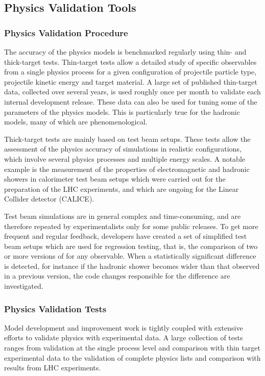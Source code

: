 \label{sec:physvaltools}
\subsection{\textbf{Physics Validation Tools}}

\subsubsection{Physics Validation Procedure}
The accuracy of the \Gfour{} physics models is benchmarked regularly using thin-
and thick-target tests.  Thin-target tests allow a detailed study of specific
observables from a single physics process for a given configuration of
projectile particle type, projectile kinetic energy and target material.
A large set of published thin-target data, collected over several years, is 
used roughly once per month to validate each internal development release. 
These data can also be used for tuning some of the parameters of the physics
models.  This is particularly true for the hadronic models, many of which are 
phenomenological.

Thick-target tests are mainly based on test beam setups.  These tests allow the
assessment of the physics accuracy of \Gfour{} simulations in realistic 
configurations, which involve several physics processes and multiple energy 
scales.  A notable example is the measurement of the properties of 
electromagnetic and hadronic showers in calorimeter test beam setups which were
carried out for the preparation of the LHC experiments, and which are ongoing
for the Linear Collider detector (CALICE).

Test beam simulations are in general complex and time-consuming, and are 
therefore repeated by experimentalists only for some \Gfour{} public releases.
To get more frequent and regular feedback, \Gfour{} developers have created a
set of simplified test beam setups which are used for regression testing, that 
is, the comparison of two or more versions of \Gfour{} for any observable.  
When a statistically significant difference is detected, for instance if the 
hadronic shower becomes wider than that observed in a previous \Gfour{} version,
the code changes responsible for the difference are investigated.

\subsubsection{Physics Validation Tests}
Model development and improvement work is tightly coupled with extensive 
efforts to validate \Gfour{} physics with experimental data.  A large collection 
of tests ranges from validation at the single process level and comparison with 
thin target experimental data to the validation of complete physics lists and 
comparison with results from LHC experiments.
 
